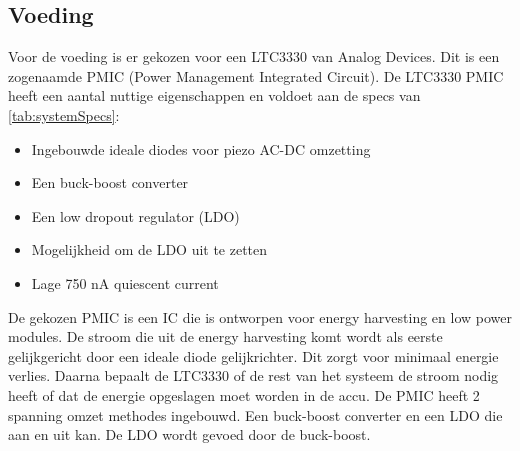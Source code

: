 \subsection{Voeding}
Voor de voeding is er gekozen voor een LTC3330 van Analog Devices. Dit is een zogenaamde PMIC (Power Management Integrated Circuit). De LTC3330 PMIC heeft een aantal nuttige eigenschappen en voldoet aan de specs van \cref{tab:systemSpecs}:
\begin{itemize}
    \item Ingebouwde ideale diodes voor piezo AC-DC omzetting
    \item Een buck-boost converter
    \item Een low dropout regulator (LDO)
    \item Mogelijkheid om de LDO uit te zetten
    \item Lage 750 nA quiescent current
\end{itemize}

De gekozen PMIC is een IC die is ontworpen voor energy harvesting en low power modules. De stroom die uit de energy harvesting komt wordt als eerste gelijkgericht door een ideale diode gelijkrichter. Dit zorgt voor minimaal energie verlies. Daarna bepaalt de LTC3330 of de rest van het systeem de stroom nodig heeft of dat de energie opgeslagen moet worden in de accu. De PMIC heeft 2 spanning omzet methodes ingebouwd. Een buck-boost converter en een LDO die aan en uit kan. De LDO wordt gevoed door de buck-boost. 

\begin{figure}
    \centering

    \label{}
\end{figure}

